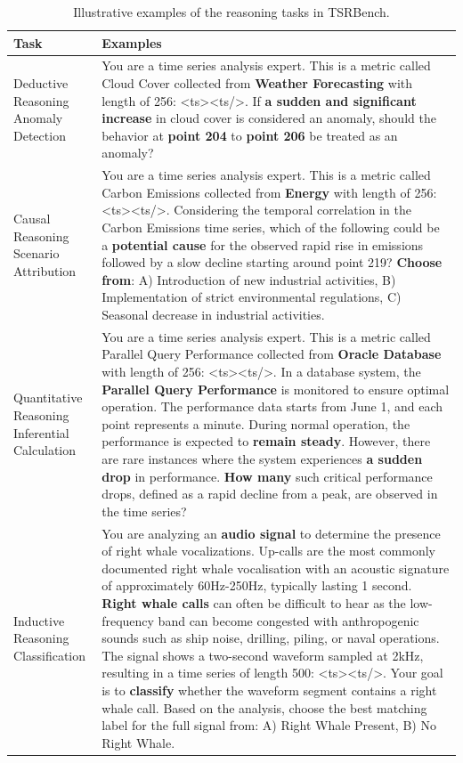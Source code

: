 \documentclass{article}
\theoremstyle{plain}
\theoremstyle{definition}
\theoremstyle{remark}
\begin{document}
\begin{table}[htbp]
\caption{Illustrative examples of the reasoning tasks in TSRBench.}
\label{tab:example}
\small
\begin{tabular}{p{3.5cm}p{13cm}}
\toprule
Task & Examples \\
\midrule
\parbox[t]{3.5cm}{Deductive Reasoning \\ Anomaly Detection} & You are a time series analysis expert. This is a metric called Cloud Cover collected from \textbf{Weather Forecasting} with length of 256: \textless ts\textgreater\textless ts/\textgreater. If \textbf{a sudden and significant increase} in cloud cover is considered an anomaly, should the behavior at \textbf{point 204} to \textbf{point 206} be treated as an anomaly? \\
\midrule
\parbox[t]{3.5cm}{Causal Reasoning \\ Scenario Attribution} & You are a time series analysis expert. This is a metric called Carbon Emissions collected from \textbf{Energy} with length of 256: \textless ts\textgreater\textless ts/\textgreater. Considering the temporal correlation in the Carbon Emissions time series, which of the following could be a \textbf{potential cause} for the observed rapid rise in emissions followed by a slow decline starting around point 219? \textbf{Choose from}: A) Introduction of new industrial activities, B) Implementation of strict environmental regulations, C) Seasonal decrease in industrial activities. \\
\midrule
\parbox[t]{3.5cm}{Quantitative Reasoning \\ Inferential Calculation} & You are a time series analysis expert. This is a metric called Parallel Query Performance collected from \textbf{Oracle Database} with length of 256: \textless ts\textgreater\textless ts/\textgreater. In a database system, the \textbf{Parallel Query Performance} is monitored to ensure optimal operation. The performance data starts from June 1, and each point represents a minute. During normal operation, the performance is expected to \textbf{remain steady}. However, there are rare instances where the system experiences \textbf{a sudden drop} in performance. \textbf{How many} such critical performance drops, defined as a rapid decline from a peak, are observed in the time series?\\
\midrule
\parbox[t]{3.5cm}{Inductive Reasoning \\ Classification} & You are analyzing an \textbf{audio signal} to determine the presence of right whale vocalizations. Up-calls are the most commonly documented right whale vocalisation with an acoustic signature of approximately 60Hz-250Hz, typically lasting 1 second. \textbf{Right whale calls} can often be difficult to hear as the low-frequency band can become congested with anthropogenic sounds such as ship noise, drilling, piling, or naval operations. The signal shows a two-second waveform sampled at 2kHz, resulting in a time series of length 500: \textless ts\textgreater\textless ts/\textgreater. Your goal is to \textbf{classify} whether the waveform segment contains a right whale call. Based on the analysis, choose the best matching label for the full signal from: A) Right Whale Present, B) No Right Whale. \\

\end{tabular}
\end{table}
\end{document}
